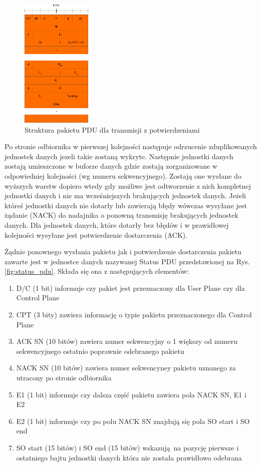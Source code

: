 \begin{figure}
	\centerline{\includegraphics[width=0.3\textwidth]{images/rlc_am_pdu.png}}
	\caption{Struktura pakietu PDU dla transmisji z potwierdzeniami}
	\label{fig:rlc_am_pdu}
\end{figure}

Po stronie odbiornika w pierwszej kolejności następuje odrzucenie zduplikowanych jednostek danych jezeli takie zostaną wykryte. Następnie jednostki danych zostają umieszczone w buforze danych gdzie zostają zorganizowane w odpowiedniej kolejności (wg numeru sekwencyjnego). Zostają one wysłane do wyższych warstw dopiero wtedy gdy możliwe jest odtworzenie z nich kompletnej jednostki danych i nie ma wcześniejszych brakujących jednostek danych. Jeżeli któreś jednostki danych nie dotarły lub zawierają błędy wówczas wysyłane jest żądanie (NACK) do nadajnika o ponowną transmisję brakujących jednostek danych. Dla jednostek danych, które dotarły bez błędów i w prawidłowej kolejności wysyłane jest potwierdzenie dostarczenia (ACK).

Żądnie ponownego wysłania pakietu jak i potwierdzenie dostarczenia pakietu zawarte jest w jednostce danych nazywanej Status PDU przedstawionej na Rys. \ref{fig:status_pdu}. Składa się ona z następujących elementów:

\begin{enumerate}
	\item D/C (1 bit) informuje czy pakiet jest przeznaczony dla User Plane czy dla Control Plane
	\item CPT (3 bity) zawiera informację o typie pakietu przeznaczonego dla Control Plane
	\item ACK SN (10 bitów) zawiera numer sekwencyjny o 1 większy od numeru sekwencyjnego ostatnio poprawnie odebranego pakietu
	\item NACK SN (10 bitów) zawiera numer sekwencyney pakietu uznanego za utracony po stronie odbiornika
	\item E1 (1 bit) informuje czy dalsza część pakietu zawiera pola NACK SN, E1 i E2
	\item E2 (1 bit) informuje czy po polu NACK SN znajdują się pola SO start i SO end
	\item SO start (15 bitów) i SO end (15 bitów) wskazują na pozycję pierwsze i ostatniego bajtu jednostki danych która nie została prawidłowo odebrana
\end{enumerate}

